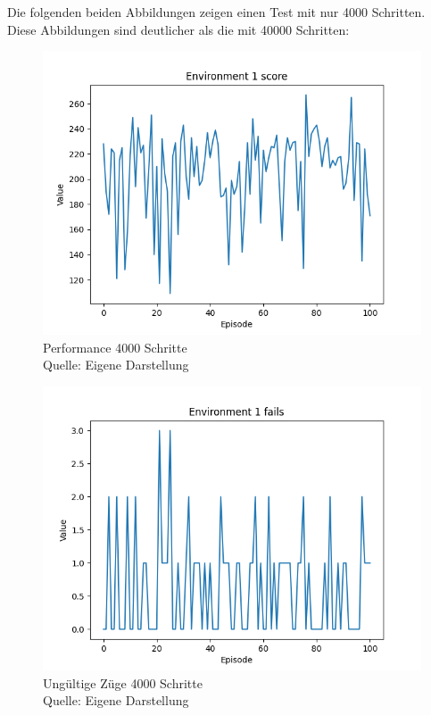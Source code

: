 Die folgenden beiden Abbildungen zeigen einen Test mit nur 4000 Schritten. Diese Abbildungen sind deutlicher als die mit 40000 Schritten:
\nopagebreak
\begin{figure}[H]
	\includegraphics[width=1\textwidth]{Bilder/final4000steps} 
	\caption[Performance 4000 Schritte]{Performance 4000 Schritte\\ Quelle: Eigene Darstellung}
\end{figure}
\begin{figure}[H]
	\includegraphics[width=1\textwidth]{Bilder/final4000stepsf} 
	\caption[Ungültige Züge 4000 Schritte]{Ungültige Züge 4000 Schritte\\ Quelle: Eigene Darstellung}
\end{figure}
